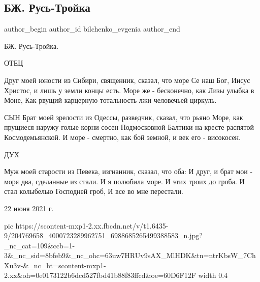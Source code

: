  
 
 
 
 
 
\subsection{БЖ. Русь-Тройка}
\label{sec:22_06_2021.fb.bilchenko_evgenia.2.rusj_trojka}
\ifcmt
 author_begin
   author_id bilchenko_evgenia
 author_end
\fi

\obeycr
БЖ. Русь-Тройка.

ОТЕЦ

Друг моей юности из Сибири, священник, сказал, что море
Се наш Бог, Иисус Христос, и лишь у земли концы есть.
Море же - бесконечно, как Лизы улыбка в Моне,
Как рвущий карцерную тотальность лжи человечьей циркуль.

СЫН
Брат моей зрелости из Одессы, разведчик, сказал, что рьяно
Море, как прущиеся наружу голые корни сосен
Подмосковной Балтики на кресте распятой Космодемьянской.
И море - смертно, как бой земной, и век его - високосен. 

ДУХ

Муж моей старости из Певека, изгнанник, сказал, что оба:
И друг, и брат мои - моря два, сделанные из стали.
И я полюбила море. И этих троих до гроба.
И стал колыбелью Господней гроб, 
И все во мне перестали. 

22 июня 2021 г.
\restorecr

\ifcmt
  pic https://scontent-mxp1-2.xx.fbcdn.net/v/t1.6435-9/204769658_4000723289962751_6988685265499388583_n.jpg?_nc_cat=109&ccb=1-3&_nc_sid=8bfeb9&_nc_ohc=63uw7HRUv9sAX_MlHDK&tn=ntrKbsW_7ChXu3v-&_nc_ht=scontent-mxp1-2.xx&oh=0e0173122b6dcd527fbd41b88f83ffcd&oe=60D6F12F
	width 0.4
\fi

